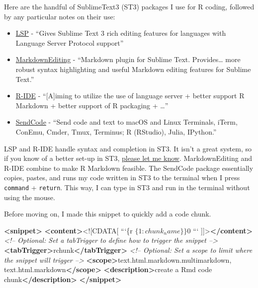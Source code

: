 \documentclass[]{book}
\newenvironment{Shaded}{\begin{snugshade}}{\end{snugshade}}
\newcommand{\KeywordTok}[1]{\textcolor[rgb]{0.13,0.29,0.53}{\textbf{#1}}}
\newcommand{\BaseNTok}[1]{\textcolor[rgb]{0.00,0.00,0.81}{#1}}
\newcommand{\CommentTok}[1]{\textcolor[rgb]{0.56,0.35,0.01}{\textit{#1}}}
\newcommand{\NormalTok}[1]{#1}
\providecommand{\tightlist}{%
  \setlength{\itemsep}{0pt}\setlength{\parskip}{0pt}}
\begin{document}
Here are the handful of SublimeText3 (ST3) packages I use for R coding,
followed by any particular notes on their use:

\begin{itemize}
\tightlist
\item
  \href{https://packagecontrol.io/packages/LSP}{LSP} - ``Gives Sublime
  Text 3 rich editing features for languages with Language Server
  Protocol support''
\item
  \href{https://packagecontrol.io/packages/MarkdownEditing}{MarkdownEditing}
  - ``Markdown plugin for Sublime Text. Provides\ldots{} more robust
  syntax highlighting and useful Markdown editing features for Sublime
  Text.''
\item
  \href{https://packagecontrol.io/packages/R-IDE}{R-IDE} -
  ``{[}A{]}iming to utilize the use of language server + better support
  R Markdown + better support of R packaging + \ldots{}''
\item
  \href{https://packagecontrol.io/packages/SendCode}{SendCode} - ``Send
  code and text to macOS and Linux Terminals, iTerm, ConEmu, Cmder,
  Tmux, Terminus; R (RStudio), Julia, IPython.''
\end{itemize}

LSP and R-IDE handle syntax and completion in ST3. It isn't a great
system, so if you know of a better set-up in ST3,
\href{https://github.com/jhrcook/package-as-analysis/issues}{please let
me know}. MarkdownEditing and R-IDE combine to make R Markdown feasible.
The SendCode package essentially copies, pastes, and runs my code
written in ST3 to the terminal when I press \texttt{command} +
\texttt{return}. This way, I can type in ST3 and run in the terminal
without using the mouse.

Before moving on, I made this snippet to quickly add a code chunk.

\begin{Shaded}
\begin{Highlighting}[]
\KeywordTok{<snippet>}
        \KeywordTok{<content>}\BaseNTok{<![CDATA[}
\NormalTok{```\{r $\{1:chunk_name\}\}}
\NormalTok{$0}
\NormalTok{```}
\BaseNTok{]]>}\KeywordTok{</content>}
        \CommentTok{<!-- Optional: Set a tabTrigger to define how to trigger the snippet -->}
        \KeywordTok{<tabTrigger>}\NormalTok{rchunk}\KeywordTok{</tabTrigger>}
        \CommentTok{<!-- Optional: Set a scope to limit where the snippet will trigger -->}
        \KeywordTok{<scope>}\NormalTok{text.html.markdown.multimarkdown, text.html.markdown}\KeywordTok{</scope>}
        \KeywordTok{<description>}\NormalTok{create a Rmd code chunk}\KeywordTok{</description>}
\KeywordTok{</snippet>}
\end{Highlighting}
\end{Shaded}
\end{document}
